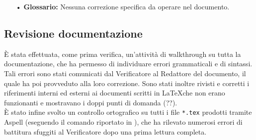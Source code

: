 {{{\begin{itemize}
			\item[•] \textbf{Glossario:} Nessuna correzione specifica da operare nel documento.
			
		\end{itemize}
	}	
	
  }
  \subsection{Revisione documentazione} {
	È stata effettuata, come prima verifica, un'attività di walkthrough su tutta la documentazione, che ha permesso di
	individuare errori grammaticali e di sintassi. Tali errori sono stati comunicati dal Verificatore al Redattore del documento,
	il quale ha poi provveduto alla loro correzione. Sono stati inoltre rivisti e corretti i riferimenti interni ed esterni ai documenti
	scritti in \LaTeX che non erano funzionanti e mostravano i doppi punti di domanda (??).\\
	\`E stato infine svolto un controllo ortografico su tutti i file \texttt{*.tex} prodotti tramite Aspell (eseguendo il comando
	riportato in \emph{\NormeDiProgetto}), che ha rilevato numerosi errori di battitura sfuggiti al Verificatore dopo una prima 
	lettura completa.
  }
}